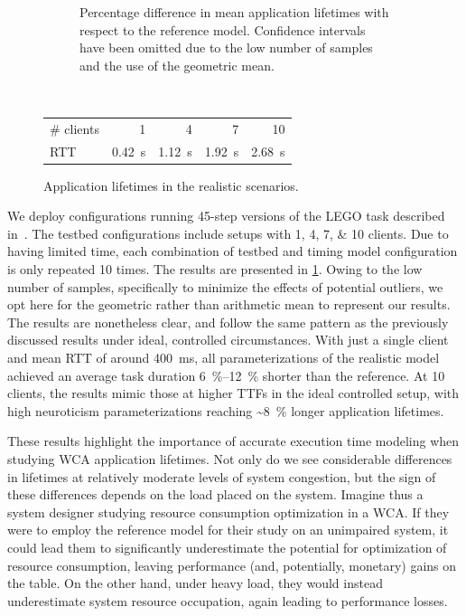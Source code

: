 \begin{figure}
\begin{subfigure}[t]{.45\textwidth}
        \caption{%
            Percentage difference in mean application lifetimes with respect to the reference model.
            Confidence intervals have been omitted due to the low number of samples and the use of the geometric mean.
        }
    \end{subfigure}\\
    \bigskip
    \begin{subtable}{\columnwidth}
        \centering
        \begin{tabular}{lrrrr}
            \toprule
            \# clients & 1 & 4 & 7 & 10 \\
            \gls{RTT} & \SI{0.42}{\second} & \SI{1.12}{\second} & \SI{1.92}{\second} & \SI{2.68}{\second} \\
            \bottomrule
        \end{tabular}
        \caption{Mean measured \glspl{RTT} for each testbed configuration.}
    \end{subtable}
    \caption{Application lifetimes in the realistic scenarios.}\label{fig:testbed_lifetimes}
\end{figure}

We deploy configurations running \num{45}-step versions of the LEGO task described in~\cite{olguinmunoz2021impact}.
The testbed configurations include setups with \numlist{1;4;7;10} clients.
Due to having limited time, each combination of testbed and timing model configuration is only repeated \num{10} times.
The results are presented in \cref{fig:testbed_lifetimes}.
Owing to the low number of samples, specifically to minimize the effects of potential outliers, we opt here for the geometric rather than arithmetic mean to represent our results.
The results are nonetheless clear, and follow the same pattern as the previously discussed results under ideal, controlled circumstances.
With just a single client and mean \gls{RTT} of around \SI{400}{\milli\second}, all parameterizations of the realistic model achieved an average task duration \SIrange{6}{12}{\percent} shorter than the reference.
At \num{10} clients, the results mimic those at higher \glspl{TTF} in the ideal controlled setup, with high neuroticism parameterizations reaching \textasciitilde\SI{8}{\percent} longer application lifetimes.

These results highlight the importance of accurate execution time modeling when studying \gls{WCA} application lifetimes.
Not only do we see considerable differences in lifetimes at relatively moderate levels of system congestion, but the sign of these differences depends on the load placed on the system.
Imagine thus a system designer studying resource consumption optimization in a \gls{WCA}.
If they were to employ the reference model for their study on an unimpaired system, it could lead them to significantly underestimate the potential for optimization of resource consumption, leaving performance (and, potentially, monetary) gains on the table.
On the other hand, under heavy load, they would instead underestimate system resource occupation, again leading to performance losses.

